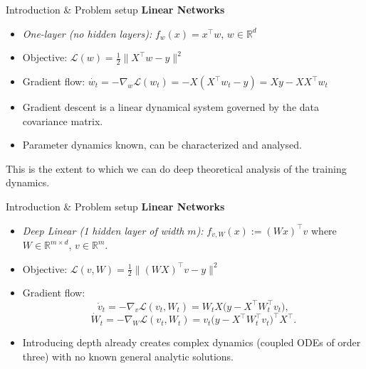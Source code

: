 \documentclass[10pt,aspectratio=169]{beamer}
\begin{document}
\begin{frame}{Introduction \& Problem setup}
	\textbf{Linear Networks}
	\begin{itemize}
		\item \textit{One-layer (no hidden layers):} $f_w(x) = x^\top w$, $w\in\mathbb{R}^d$
		      \pause
		\item Objective: $\mathcal{L}(w) = \frac{1}{2} \|X^\top w - y\|^2$
		\item Gradient flow: $\dot{w_t} = -\nabla_w\mathcal{L}(w_t) = -X(X^\top w_t - y) = Xy - XX^\top w_t$
		      \pause
		\item Gradient descent is a linear dynamical system governed by the data covariance matrix.
		      \pause
		\item Parameter dynamics known, can be characterized and analysed.
		      \pause
	\end{itemize}

	This is the extent to which we can do deep theoretical analysis of the training dynamics.
\end{frame}

\begin{frame}{Introduction \& Problem setup}
	\textbf{Linear Networks}
	\begin{itemize}
		\item \textit{Deep Linear (1 hidden layer of width $m$):}
		      $f_{v,W}(x) := (Wx)^\top v$ where $W \in \mathbb{R}^{m \times d}$, $v \in \mathbb{R}^{m}$.
		      \pause
		\item Objective: $\mathcal{L}(v,W) = \frac{1}{2} \|(WX)^\top v - y\|^2$
		      \pause
		\item Gradient flow:
		      \[
			      \dot v_t = -\nabla_v \mathcal{L}(v_t,W_t)
			      = W_t X \bigl(y - X^\top W_t^\top v_t\bigr),
		      \]
		      \pause
		      \[
			      \dot W_t = -\nabla_W \mathcal{L}(v_t,W_t)
			      = v_t \bigl(y - X^\top W_t^\top v_t\bigr)^\top X^\top .
		      \]
		      \pause
		\item Introducing depth already creates complex dynamics (coupled ODEs of order three) with no known general analytic
		      solutions.
	\end{itemize}

\end{frame}
\end{document}
